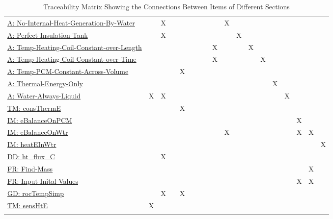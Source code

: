 \documentclass[12pt]{article}
\begin{document}
\begin{longtable}{l l l l l l l l l l l l l l l l l l}
\hyperref[A:No-Internal-Heat-Generation-By-Water]{A: No-Internal-Heat-Generation-By-Water} &  & X &  &  &  &  &  &  & X &  &  &  &  &  &  &  & 
\\
\hyperref[A:Perfect-Insulation-Tank]{A: Perfect-Insulation-Tank} &  & X &  &  &  &  &  &  &  & X &  &  &  &  &  &  & 
\\
\hyperref[A:Temp-Heating-Coil-Constant-over-Length]{A: Temp-Heating-Coil-Constant-over-Length} &  &  &  &  &  &  &  & X &  &  & X &  &  &  &  &  & 
\\
\hyperref[A:Temp-Heating-Coil-Constant-over-Time]{A: Temp-Heating-Coil-Constant-over-Time} &  &  &  &  &  &  &  & X &  &  &  & X &  &  &  &  & 
\\
\hyperref[A:Temp-PCM-Constant-Across-Volume]{A: Temp-PCM-Constant-Across-Volume} &  &  &  & X &  &  &  &  &  &  &  &  &  &  &  &  & 
\\
\hyperref[A:Thermal-Energy-Only]{A: Thermal-Energy-Only} &  &  &  &  &  &  &  &  &  &  &  &  & X &  &  &  & 
\\
\hyperref[A:Water-Always-Liquid]{A: Water-Always-Liquid} & X & X &  &  &  &  &  &  &  &  &  &  &  & X &  &  & 
\\
\hyperref[TM:consThermE]{TM: consThermE} &  &  &  & X &  &  &  &  &  &  &  &  &  &  &  &  & 
\\
\hyperref[IM:eBalanceOnPCM]{IM: eBalanceOnPCM} &  &  &  &  &  &  &  &  &  &  &  &  &  &  & X &  & 
\\
\hyperref[IM:eBalanceOnWtr]{IM: eBalanceOnWtr} &  &  &  &  &  &  &  &  & X &  &  &  &  &  & X & X & 
\\
\hyperref[IM:heatEInWtr]{IM: heatEInWtr} &  &  &  &  &  &  &  &  &  &  &  &  &  &  &  &  & X
\\
\hyperref[DD:ht.flux.C]{DD: ht\_flux\_C} &  & X &  &  &  &  &  &  &  &  &  &  &  &  &  &  & 
\\
\hyperref[reqFM]{FR: Find-Mass} &  &  &  &  &  &  &  &  &  &  &  &  &  &  &  & X & 
\\
\hyperref[reqIIV]{FR: Input-Inital-Values} &  &  &  &  &  &  &  &  &  &  &  &  &  &  & X & X & 
\\
\hyperref[GD:rocTempSimp]{GD: rocTempSimp} &  & X &  & X &  &  &  &  &  &  &  &  &  &  &  &  & 
\\
\hyperref[TM:sensHtE]{TM: sensHtE} & X &  &  &  &  &  &  &  &  &  &  &  &  &  &  &  & 
\\
\bottomrule
\caption{Traceability Matrix Showing the Connections Between Items of Different Sections}
\label{Table:Tracey}
\end{longtable}
\end{document}
